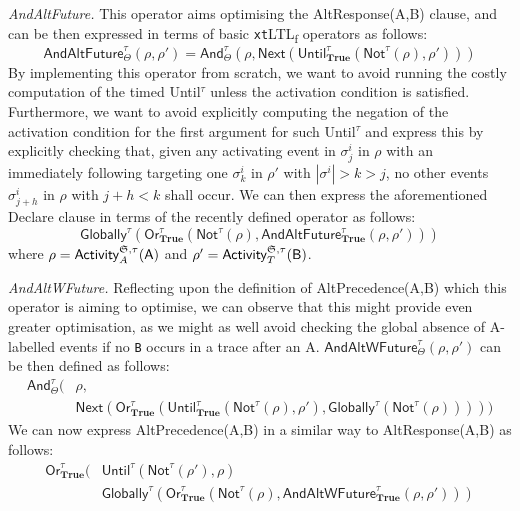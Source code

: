 \documentclass[sigconf]{acmart}
\begin{document}
\textit{AndAltFuture.} This operator aims  optimising the \textsf{AltResponse(A,B)} clause, and can be then expressed in terms of basic \texttt{xt}LTL\textsubscript{f} operators as follows:
\begin{equation}\label{AAF}
\textsf{AndAltFuture}^\tau_\Theta(\rho,\rho')=\textsf{And}^\tau_\Theta(\rho,\textsf{Next}(\textsf{Until}^\tau_\textbf{True}(\textsf{Not}^\tau(\rho),\rho')))
\end{equation}
By implementing this operator from scratch, we want to avoid running the costly computation of the timed \textsf{Until}$^\tau$ unless the activation condition is satisfied. Furthermore, we want to avoid explicitly computing the negation of the activation condition for the first argument for such \textsf{Until}$^\tau$ and express this by explicitly checking that, given any activating event in $\sigma^i_j$ in $\rho$ with an immediately following targeting one $\sigma^i_{k}$ in $\rho'$ with $|\sigma^i|>k>j$, no other events $\sigma^i_{j+h}$ in $\rho$ with $j+h<k$ shall occur. We can then express the aforementioned Declare clause in terms of the recently defined operator as follows:
\[\textsf{Globally}^\tau(\textsf{Or}^\tau_\textbf{True}(\textsf{Not}^\tau(\rho),\textsf{AndAltFuture}^{\tau}_{\textbf{True}}(\rho,\rho')))\]
where $\rho=\textsf{Activity}^{\mathfrak{S},\tau}_A(\textsf{A})$ and $\rho'=\textsf{Activity}^{\mathfrak{S},\tau}_T(\textsf{B})$.
\medskip

\textit{AndAltWFuture.} Reflecting upon the definition of \textsf{AltPrecedence(A,B)} which this operator is aiming to optimise, we can observe that this might provide even greater optimisation, as we might as well avoid checking the global absence of \textsf{A}-labelled events if no \texttt{B} occurs in a trace after an \textsf{A}. $\textsf{AndAltWFuture}^\tau_\Theta(\rho,\rho')$ can be then defined as follows:
\begin{equation}\label{AAW}
\begin{split}
\textsf{And}^\tau_\Theta(&\rho,\\
&\textsf{Next}(\textsf{Or}^\tau_\textbf{True}(\textsf{Until}^\tau_\textbf{True}(\textsf{Not}^\tau(\rho),\rho'),\textsf{Globally}^\tau(\textsf{Not}^\tau(\rho)))))
\end{split}
\end{equation}
We can now express \textsf{AltPrecedence(A,B)} in a similar way to \textsf{AltResponse(A,B)} as follows:
\[\begin{split}
\textsf{Or}^\tau_{\textbf{True}}(&\textsf{Until}^\tau(\textsf{Not}^\tau(\rho'),\rho)\\
&\textsf{Globally}^\tau(\textsf{Or}^\tau_\textbf{True}(\textsf{Not}^\tau(\rho),\textsf{AndAltWFuture}^{\tau}_{\textbf{True}}(\rho,\rho')))\\
\end{split}\]
\medskip
\end{document}
